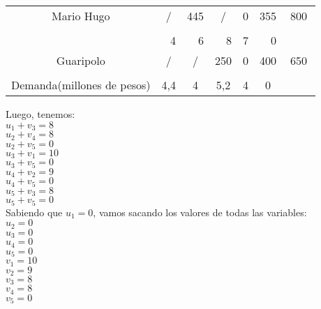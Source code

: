 \documentclass[12pt,letterpaper]{article}
\begin{document}
\begin{center}
\begin{tabular}{ccc|ccc|ccc|ccc|ccc|ccc|ccc}
\multicolumn{3}{c|}{Mario Hugo} & \multicolumn{3}{c|}{/} & \multicolumn{3}{c|}{445} & \multicolumn{3}{c|}{/} & \multicolumn{3}{c|}{0}& \multicolumn{3}{c|}{355} & \multicolumn{3}{c}{800}\\
\multicolumn{3}{c|}{} & \multicolumn{3}{c|}{} & \multicolumn{3}{c|}{} & \multicolumn{3}{c|}{} & \multicolumn{3}{c|}{} & \multicolumn{3}{c|}{}\\
\cline{1-15}
\multicolumn{3}{c|}{} & \multicolumn{3}{r|}{4} & \multicolumn{3}{r|}{6} & \multicolumn{3}{r|}{8} & \multicolumn{3}{r|}{7} & \multicolumn{3}{r|}{0}\\
\multicolumn{3}{c|}{Guaripolo} & \multicolumn{3}{c|}{/} & \multicolumn{3}{c|}{/} & \multicolumn{3}{c|}{250} & \multicolumn{3}{c|}{0}  & \multicolumn{3}{c|}{400} & \multicolumn{3}{c}{650}\\
\multicolumn{3}{c|}{} & \multicolumn{3}{c|}{} & \multicolumn{3}{c|}{} & \multicolumn{3}{c|}{} & \multicolumn{3}{c|}{} & \multicolumn{3}{c|}{}\\
\cline{1-15}
\multicolumn{3}{c|}{Demanda(millones de pesos)} & \multicolumn{3}{c|}{4,4} & \multicolumn{3}{c|}{4} & \multicolumn{3}{c|}{5,2}& \multicolumn{3}{c|}{4}& \multicolumn{3}{c}{0} & \multicolumn{3}{c}{}\\

\end{tabular}
\end{center}

Luego, tenemos: \\

$u_{1}+v_{3}=8$ \\
$u_{2}+v_{4}=8$ \\
$u_{2}+v_{5}=0$ \\
$u_{3}+v_{1}=10$ \\
$u_{3}+v_{5}=0$ \\
$u_{4}+v_{2}=9$ \\
$u_{4}+v_{5}=0$ \\
$u_{5}+v_{3}=8$ \\
$u_{5}+v_{5}=0$ \\

Sabiendo que $u_{1}=0$, vamos sacando los valores de todas las variables: \\

$u_{2}=0$ \\
$u_{3}=0$ \\
$u_{4}=0$ \\
$u_{5}=0$ \\
$v_{1}=10$ \\
$v_{2}=9$ \\
$v_{3}=8$ \\
$v_{4}=8$ \\
$v_{5}=0$ \\
\end{document}
